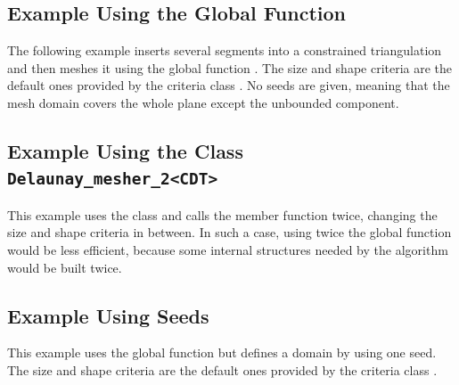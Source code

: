 \subsection{Example Using the Global Function}

The following example inserts several segments into a constrained
triangulation and then meshes it using the global function
. The size and shape criteria are the default ones
provided by the criteria class . No seeds are
given, meaning that the mesh domain covers the whole plane except the
unbounded component.


\subsection{Example Using the Class \texttt{Delaunay_mesher_2<CDT>}}

This example uses the class  and calls
  the  member function twice, changing the size and
  shape criteria in between. In such a case, using twice the global
  function  would be less efficient,
  because some internal structures needed by the algorithm would be
  built twice.


\subsection{Example Using Seeds}

This example uses the global function  but
defines a domain by using one seed. The size and shape criteria are the
default ones provided by the criteria class .


